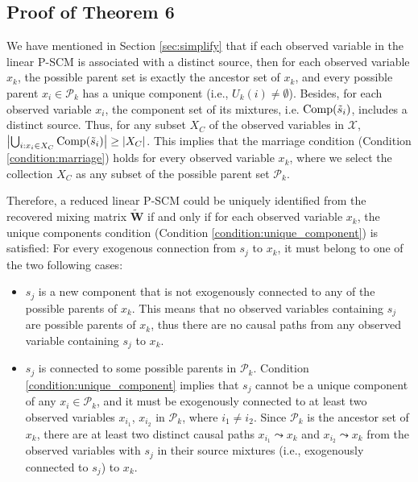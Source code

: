 \documentclass[12pt]{article}
\newcommand{\setX}{\mathcal{X}}
\newcommand{\bW}{\mathbf{W}}
\begin{document}
\subsection{Proof of Theorem 6} \label{app:proof_simplify} %
We have mentioned in Section \ref{sec:simplify} that if each observed variable in the linear P-SCM is associated with a distinct source, then for each observed variable $x_k$, the possible parent set is exactly the ancestor set of $x_k$, and every possible parent $x_i\in \mathcal{P}_k$ has a unique component (i.e., $U_k(i)\neq \emptyset$). Besides, for each observed variable $x_i$, the component set of its mixtures, i.e. ${\rm{Comp}}(\tilde{s}_i)$, includes a distinct source. Thus, for any subset $X_C$ of the observed variables in $\setX$, $ \left| \bigcup_{i:x_i\in X_C} {\rm{Comp}}(\tilde{s}_i) \right|\geq |X_C| $. This implies that the marriage condition (Condition \ref{condition:marriage}) holds for every observed variable $x_k$, where we select the collection $X_C$ as any subset of the possible parent set $\mathcal{P}_k$.

Therefore, a reduced linear P-SCM could be uniquely identified from the recovered mixing matrix $\tilde{\bW}$ if and only if for each observed variable $x_k$, the unique components condition (Condition \ref{condition:unique_component}) is satisfied: For every exogenous connection from $s_j$ to $x_k$, it must belong to one of the two following cases:
\begin{itemize}
\item $s_j$ is a new component that is not exogenously connected to any of the possible parents of $x_k$. This means that no observed variables containing $s_j$ are possible parents of $x_k$, thus there are no causal paths from any observed variable containing $s_j$ to $x_k$.

\item $s_j $ is connected to some possible parents in $\mathcal{P}_k$. Condition \ref{condition:unique_component} implies that $s_j$ cannot be a unique component of any $x_i\in\mathcal{P}_k$, and it must be exogenously connected to at least two observed variables $x_{i_1}$, $x_{i_2}$ in $\mathcal{P}_k$, where $i_1\neq i_2$. Since $\mathcal{P}_k$ is the ancestor set of $x_k$, there are at least two distinct causal paths $x_{i_1} \leadsto x_k $ and $x_{i_2} \leadsto x_k $ from the observed variables with $s_j$ in their source mixtures (i.e., exogenously connected to $s_j$) to $x_k$.

\end{itemize}
\end{document}
